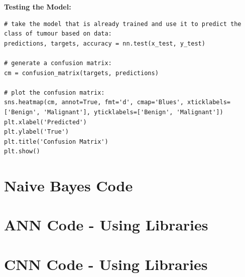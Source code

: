 \documentclass[a4paper]{article}
\begin{document}
\newpage
\textbf{Testing the Model:}
\begin{lstlisting}
# take the model that is already trained and use it to predict the class of tumour based on data:
predictions, targets, accuracy = nn.test(x_test, y_test)

# generate a confusion matrix:
cm = confusion_matrix(targets, predictions)

# plot the confusion matrix:
sns.heatmap(cm, annot=True, fmt='d', cmap='Blues', xticklabels=['Benign', 'Malignant'], yticklabels=['Benign', 'Malignant'])
plt.xlabel('Predicted')
plt.ylabel('True')
plt.title('Confusion Matrix')
plt.show()
\end{lstlisting}

\newpage
\section{Naive Bayes Code}

\newpage
\section{ANN Code - Using Libraries}

\newpage
\section{CNN Code - Using Libraries}
\end{document}
